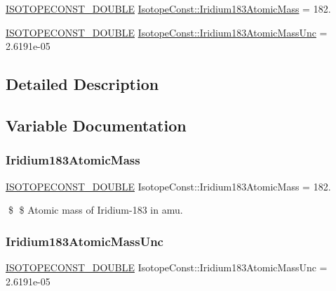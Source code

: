 \begin{DoxyCompactItemize}
\item 
\mbox{\hyperlink{group___isotope_const-_macros_ga8f45a7272ce02c0b4c65c44636ed719a}{I\+S\+O\+T\+O\+P\+E\+C\+O\+N\+S\+T\+\_\+\+D\+O\+U\+B\+LE}} \mbox{\hyperlink{group___isotope_const-_iridium-_ir183_ga6cb83f27d66d10aefa9e943f7c24747d}{Isotope\+Const\+::\+Iridium183\+Atomic\+Mass}} = 182.
\item 
\mbox{\hyperlink{group___isotope_const-_macros_ga8f45a7272ce02c0b4c65c44636ed719a}{I\+S\+O\+T\+O\+P\+E\+C\+O\+N\+S\+T\+\_\+\+D\+O\+U\+B\+LE}} \mbox{\hyperlink{group___isotope_const-_iridium-_ir183_gaab22b748ab8e242edc7c4abf43751634}{Isotope\+Const\+::\+Iridium183\+Atomic\+Mass\+Unc}} = 2.\+6191e-\/05
\end{DoxyCompactItemize}


\subsection{Detailed Description}


\subsection{Variable Documentation}
\mbox{\label{group___isotope_const-_iridium-_ir183_ga6cb83f27d66d10aefa9e943f7c24747d}} 
\subsubsection{\texorpdfstring{Iridium183\+Atomic\+Mass}{Iridium183AtomicMass}}
{\footnotesize\ttfamily \mbox{\hyperlink{group___isotope_const-_macros_ga8f45a7272ce02c0b4c65c44636ed719a}{I\+S\+O\+T\+O\+P\+E\+C\+O\+N\+S\+T\+\_\+\+D\+O\+U\+B\+LE}} Isotope\+Const\+::\+Iridium183\+Atomic\+Mass = 182.}

\$ \$ Atomic mass of Iridium-\/183 in amu. \mbox{\label{group___isotope_const-_iridium-_ir183_gaab22b748ab8e242edc7c4abf43751634}} 
\subsubsection{\texorpdfstring{Iridium183\+Atomic\+Mass\+Unc}{Iridium183AtomicMassUnc}}
{\footnotesize\ttfamily \mbox{\hyperlink{group___isotope_const-_macros_ga8f45a7272ce02c0b4c65c44636ed719a}{I\+S\+O\+T\+O\+P\+E\+C\+O\+N\+S\+T\+\_\+\+D\+O\+U\+B\+LE}} Isotope\+Const\+::\+Iridium183\+Atomic\+Mass\+Unc = 2.\+6191e-\/05}

